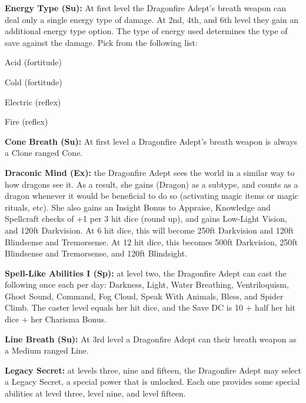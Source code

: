 \textbf{Energy Type (Su):} At first level the Dragonfire Adept's breath weapon can deal only a single energy type of damage. At 2nd, 4th, and 6th level they gain an additional energy type option. The type of energy used determines the type of save against the damage. Pick from the following list:
\begin{itemize*}
\item Acid (fortitude)
\item Cold (fortitude)
\item Electric (reflex)
\item Fire (reflex)
\end{itemize*}

\textbf{Cone Breath (Su):} At first level a Dragonfire Adept's breath weapon is always a Clone ranged Cone.

\textbf{Draconic Mind (Ex):} the Dragonfire Adept sees the world in a similar way to how dragons see it. As a result, she gains (Dragon) as a subtype, and counts as a dragon whenever it would be beneficial to do so (activating magic items or magic rituals, etc). She also gains an Insight Bonus to Appraise, Knowledge and Spellcraft checks of +1 per 3 hit dice (round up), and gains Low-Light Vision, and 120ft Darkvision. At 6 hit dice, this will become 250ft Darkvision and 120ft Blindsense and Tremorsense. At 12 hit dice, this becomes 500ft Darkvision, 250ft Blindsense and Tremorsense, and 120ft Blindsight.

\textbf{Spell-Like Abilities I (Sp):} at level two, the Dragonfire Adept can cast the following once each per day: Darkness, Light, Water Breathing, Ventriloquism, Ghost Sound, Command, Fog Cloud, Speak With Animals, Bless, and Spider Climb. The caster level equals her hit dice, and the Save DC is 10 + half her hit dice + her Charisma Bonus.

\textbf{Line Breath (Su):} At 3rd level a Dragonfire Adept can their breath weapon as a Medium ranged Line.

\textbf{Legacy Secret:} at levels three, nine and fifteen, the Dragonfire Adept may select a Legacy Secret, a special power that is unlocked. Each one provides some special abilities at level three, level nine, and level fifteen.

